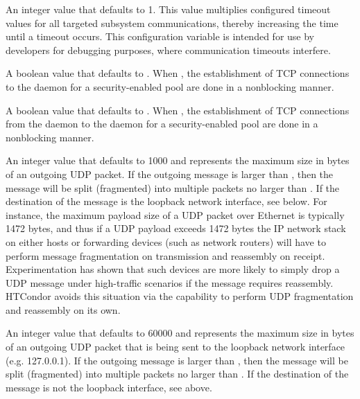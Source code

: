 \begin{description}
\label{param:SubsysTimeoutMultiplier}
\item[\MacroB{<SUBSYS>\_TIMEOUT\_MULTIPLIER}]
  An integer value that defaults to 1.
  This value multiplies configured timeout values
  for all targeted subsystem communications,
  thereby increasing the time until a timeout occurs.
  This configuration variable is intended for use by developers for
  debugging purposes, where communication timeouts interfere.

\label{param:NonblockingCollectorUpdate}
\item[\Macro{NONBLOCKING\_COLLECTOR\_UPDATE}]
  A boolean value that defaults to .
  When , the establishment of TCP connections
  to the  daemon
  for a security-enabled pool are done in a nonblocking manner.

\label{param:NegotiatorUseNonblockingStartdContact}
\item[\Macro{NEGOTIATOR\_USE\_NONBLOCKING\_STARTD\_CONTACT}]
  A boolean value that defaults to .
  When , the establishment of TCP connections
  from the  daemon to the  daemon
  for a security-enabled pool are done in a nonblocking manner.

\label{param:UdpNetworkFragmentSize}
\item[\Macro{UDP\_NETWORK\_FRAGMENT\_SIZE}]
	An integer value that defaults to 1000 and represents the maximum
	size in bytes of an outgoing UDP packet.  If the outgoing message
	is larger than , then the message
	will be split (fragmented) into multiple packets no larger than
	. If the destination of the message
	is the loopback network interface, see 
	 below. 
	For instance, the maximum payload size of a UDP packet over Ethernet
	is typically 1472 bytes, and thus if a UDP payload exceeds 1472 bytes 
	the IP network stack on either hosts or forwarding devices (such
	as network routers) will have to perform message fragmentation 
	on transmission and reassembly on receipt.  Experimentation
	has shown that such devices are more likely to simply drop a UDP message
	under high-traffic scenarios if the message requires reassembly.  
	HTCondor avoids this situation via the capability to
	perform UDP fragmentation and reassembly on its own. 

\label{param:UdpLoopbackFragmentSize}
\item[\Macro{UDP\_LOOPBACK\_FRAGMENT\_SIZE}]
	An integer value that defaults to 60000 and represents the maximum
	size in bytes of an outgoing UDP packet that is being sent
	to the loopback network interface (e.g. 127.0.0.1).  
	If the outgoing message
	is larger than , then the message
	will be split (fragmented) into multiple packets no larger than
	.
	If the destination of the message is not the loopback interface,
	see  above.
\end{description}


